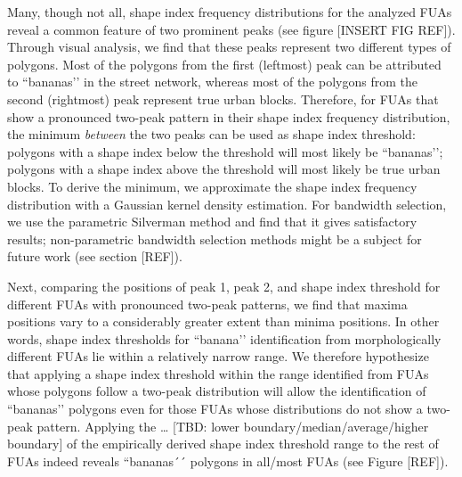 Many, though not all, shape index frequency distributions for the analyzed FUAs reveal a common feature of two prominent peaks (see figure [INSERT FIG REF]). Through visual analysis, we find that these peaks represent two different types of polygons. Most of the polygons from the first (leftmost) peak can be attributed to ``bananas’’ in the street network, whereas most of the polygons from the second (rightmost) peak represent true urban blocks. Therefore, for FUAs that show a pronounced two-peak pattern in their shape index frequency distribution, the minimum \textit{between} the two peaks can be used as shape index threshold: polygons with a shape index below the threshold will most likely be ``bananas’’; polygons with a shape index above the threshold will most likely be true urban blocks. To derive the minimum, we approximate the shape index frequency distribution with a Gaussian kernel density estimation. For bandwidth selection, we use the parametric Silverman method \cite{silverman_using_1981} and find that it gives satisfactory results; non-parametric bandwidth selection methods might be a subject for future work (see section [REF]). 

Next, comparing the positions of peak 1, peak 2, and shape index threshold for different FUAs with pronounced two-peak patterns, we find that maxima positions vary to a considerably greater extent than minima positions. In other words, shape index thresholds for ``banana’’ identification from morphologically different FUAs lie within a relatively narrow range. We therefore hypothesize that applying a shape index threshold within the range identified from FUAs whose polygons follow a two-peak distribution will allow the identification of ``bananas’’ polygons even for those FUAs whose distributions do not show a two-peak pattern. Applying the … [TBD: lower boundary/median/average/higher boundary] of the empirically derived shape index threshold range to the rest of FUAs indeed reveals ``bananas´´ polygons in all/most FUAs (see Figure [REF]).
